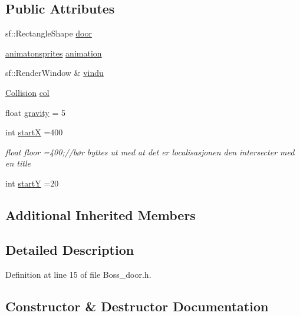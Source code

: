 \subsection*{Public Attributes}
\begin{DoxyCompactItemize}
\item 
sf\+::\+Rectangle\+Shape \hyperlink{class_boss__door_a8b719291e134d7cf4bee8fd2372d3087}{door}
\item 
\hyperlink{classanimatonsprites}{animatonsprites} \hyperlink{class_boss__door_a78f03723848d84a1eae62fafa7933f92}{animation}
\item 
sf\+::\+Render\+Window \& \hyperlink{class_boss__door_a41a5f7ad972a57cc11fa7629d4cce412}{vindu}
\item 
\hyperlink{class_collision}{Collision} \hyperlink{class_boss__door_a591dd5dd3815c47b2f8390fe63953ac2}{col}
\item 
float \hyperlink{class_boss__door_a780a847f966efcd3073642ade6a7c97f}{gravity} = 5
\item 
int \hyperlink{class_boss__door_aa9c098587ea1c0919540f838e28c1440}{startX} =400
\begin{DoxyCompactList}\small\item\em float floor =400;//bør byttes ut med at det er localisasjonen den intersecter med en title \end{DoxyCompactList}\item 
int \hyperlink{class_boss__door_a617e52e98386b7202fc78a24c4f5037d}{startY} =20
\end{DoxyCompactItemize}
\subsection*{Additional Inherited Members}


\subsection{Detailed Description}


Definition at line 15 of file Boss\+\_\+door.\+h.



\subsection{Constructor \& Destructor Documentation}
\hypertarget{class_boss__door_a9714a08a688e8dc4819db1ade1d502fd}{}\label{class_boss__door_a9714a08a688e8dc4819db1ade1d502fd} 
